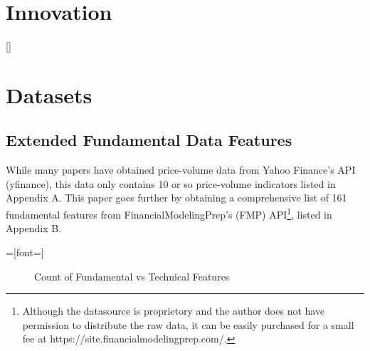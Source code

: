 \documentclass[a4paper,12pt]{report}
\renewcommand\thechapter{\Roman{chapter}}
\numberwithin{equation}{section}
\theoremstyle{definition}
\begin{document}
\titleformat{\chapter}[block]
  {\normalfont\huge\bfseries}{\thechapter.}{1em}{\Huge\centering}
\titlespacing*{\chapter}{0pt}{230pt}{0pt}
\setcounter{chapter}{1}
\renewcommand{\thechapter}{\Roman{chapter}}
\chapter{Innovation}

\titleformat{\chapter}[display]{\Large}{\centering
  \MakeUppercase{\chaptername}\quad{\Huge\thechapter}}{0pt}{\titlerule[.5pt]\vspace{10pt}\centering
  \MakeUppercase}[\vspace{10pt}{\titlerule[.5pt]}]%
\titlespacing{\chapter}{0pt}{-80pt}{1cm}%
\renewcommand{\thechapter}{\arabic{chapter}}
\setcounter{chapter}{3}
\chapter{Datasets}
\section{Extended Fundamental Data Features}
While many papers have obtained price-volume data from Yahoo Finance's API (yfinance), this data only contains 10 or so price-volume indicators listed in Appendix A. This paper goes further by obtaining a comprehensive list of 161 fundamental features from FinancialModelingPrep's (FMP) API\footnote{Although the datasource is proprietory and the author does not have permission to distribute the raw data, it can be easily purchased for a small fee at https://site.financialmodelingprep.com/.}, listed in Appendix B. 

=[font=\large]
\begin{figure}[H]
  \centering
    \caption{Count of Fundamental vs Technical Features}
    \label{fund_tec_pie}
  \end{figure}
\end{document}
